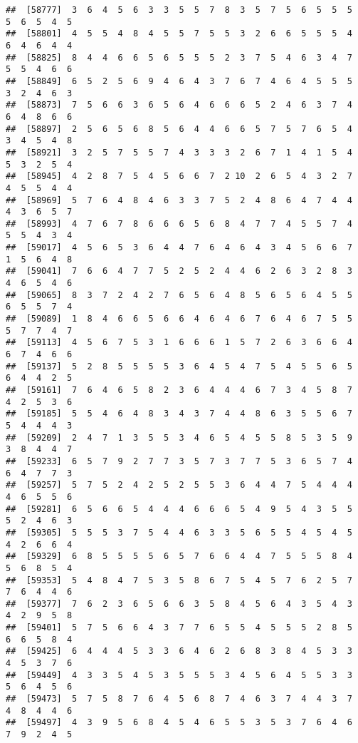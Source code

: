 \documentclass[
]{book}
\begin{document}
\begin{verbatim}
##  [58777]  3  6  4  5  6  3  3  5  5  7  8  3  5  7  5  6  5  5  5  5  6  5  4  5
##  [58801]  4  5  5  4  8  4  5  5  7  5  5  3  2  6  6  5  5  5  4  6  4  6  4  4
##  [58825]  8  4  4  6  6  5  6  5  5  5  2  3  7  5  4  6  3  4  7  5  5  4  6  6
##  [58849]  6  5  2  5  6  9  4  6  4  3  7  6  7  4  6  4  5  5  5  3  2  4  6  3
##  [58873]  7  5  6  6  3  6  5  6  4  6  6  6  5  2  4  6  3  7  4  6  4  8  6  6
##  [58897]  2  5  6  5  6  8  5  6  4  4  6  6  5  7  5  7  6  5  4  3  4  5  4  8
##  [58921]  3  2  5  7  5  5  7  4  3  3  3  2  6  7  1  4  1  5  4  5  3  2  5  4
##  [58945]  4  2  8  7  5  4  5  6  6  7  2 10  2  6  5  4  3  2  7  4  5  5  4  4
##  [58969]  5  7  6  4  8  4  6  3  3  7  5  2  4  8  6  4  7  4  4  4  3  6  5  7
##  [58993]  4  7  6  7  8  6  6  6  5  6  8  4  7  7  4  5  5  7  4  5  5  4  3  4
##  [59017]  4  5  6  5  3  6  4  4  7  6  4  6  4  3  4  5  6  6  7  1  5  6  4  8
##  [59041]  7  6  6  4  7  7  5  2  5  2  4  4  6  2  6  3  2  8  3  4  6  5  4  6
##  [59065]  8  3  7  2  4  2  7  6  5  6  4  8  5  6  5  6  4  5  5  6  5  5  7  4
##  [59089]  1  8  4  6  6  5  6  6  4  6  4  6  7  6  4  6  7  5  5  5  7  7  4  7
##  [59113]  4  5  6  7  5  3  1  6  6  6  1  5  7  2  6  3  6  6  4  6  7  4  6  6
##  [59137]  5  2  8  5  5  5  5  3  6  4  5  4  7  5  4  5  5  6  5  6  4  4  2  5
##  [59161]  7  6  4  6  5  8  2  3  6  4  4  4  6  7  3  4  5  8  7  4  2  5  3  6
##  [59185]  5  5  4  6  4  8  3  4  3  7  4  4  8  6  3  5  5  6  7  5  4  4  4  3
##  [59209]  2  4  7  1  3  5  5  3  4  6  5  4  5  5  8  5  3  5  9  3  8  4  4  7
##  [59233]  6  5  7  9  2  7  7  3  5  7  3  7  7  5  3  6  5  7  4  6  4  7  7  3
##  [59257]  5  7  5  2  4  2  5  2  5  5  3  6  4  4  7  5  4  4  4  4  6  5  5  6
##  [59281]  6  5  6  6  5  4  4  4  6  6  6  5  4  9  5  4  3  5  5  5  2  4  6  3
##  [59305]  5  5  5  3  7  5  4  4  6  3  3  5  6  5  5  4  5  4  5  4  2  6  6  4
##  [59329]  6  8  5  5  5  5  6  5  7  6  6  4  4  7  5  5  5  8  4  5  6  8  5  4
##  [59353]  5  4  8  4  7  5  3  5  8  6  7  5  4  5  7  6  2  5  7  7  6  4  4  6
##  [59377]  7  6  2  3  6  5  6  6  3  5  8  4  5  6  4  3  5  4  3  4  2  9  5  8
##  [59401]  5  7  5  6  6  4  3  7  7  6  5  5  4  5  5  5  2  8  5  6  6  5  8  4
##  [59425]  6  4  4  4  5  3  3  6  4  6  2  6  8  3  8  4  5  3  3  4  5  3  7  6
##  [59449]  4  3  3  5  4  5  3  5  5  5  3  4  5  6  4  5  5  3  3  5  6  4  5  6
##  [59473]  5  7  5  8  7  6  4  5  6  8  7  4  6  3  7  4  4  3  7  4  8  4  4  6
##  [59497]  4  3  9  5  6  8  4  5  4  6  5  5  3  5  3  7  6  4  6  7  9  2  4  5

\end{verbatim}
\end{document}
